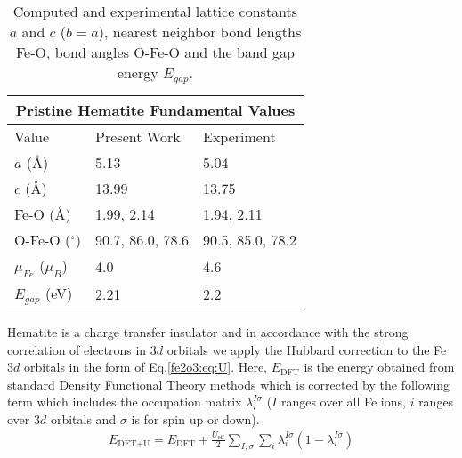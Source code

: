 \begin{table}[H]
\begin{center}
\begin{tabular}{p{2.75cm}p{2.75cm}p{2.75cm}}
 \hline
 \multicolumn{3}{c}{ Pristine Hematite Fundamental Values \vspace{0.5mm}} \\
 \hline
 Value & Present Work & Experiment \cite{finger1980crystal} \\
 \hline
 $a$ ({\AA}) & 5.13  & 5.04 \\
 $c$ ({\AA}) & 13.99  & 13.75 \\
 Fe-O ({\AA}) & 1.99, 2.14  & 1.94, 2.11 \\
 O-Fe-O ($^{\circ}$) &  90.7, 86.0, 78.6 & 90.5, 85.0, 78.2 \\
 $\mu_{Fe}$ ($\mu_B$) & 4.0 & 4.6 \cite{coey1971study} \\
 $E_{gap}$ (eV) &  2.21  & 2.2  \cite{gilbert2009band}\\
 \hline
\end{tabular}
\caption{Computed and experimental lattice constants $a$ and $c$ ($b=a$), nearest neighbor bond lengths Fe-O, bond angles O-Fe-O and the band gap energy $E_{gap}$.} \label{fe2o3:table:pristine}
\end{center}
\end{table}

Hematite is a charge transfer insulator \cite{drager1992high,catti1995theoretical} and in accordance with the strong correlation of electrons in $3d$ orbitals we apply the Hubbard correction \cite{dudarev1998electron} to the Fe $3d$ orbitals in the form of Eq.\ref{fe2o3:eq:U}. Here, $E_\text{DFT}$ is the energy obtained from standard Density Functional Theory methods which is corrected by the following term which includes the occupation matrix $\lambda_i^{I\sigma}$ ($I$ ranges over all Fe ions, $i$ ranges over $3d$ orbitals and $\sigma$ is for spin up or down).
 \begin{align}
    E_{\text{DFT}+\text{U}}=E_{\text{DFT}}+\frac{U_{\text{eff}}}{2}\sum_{I,\sigma}\sum_{i}\lambda_{i}^{I\sigma}(1-\lambda_{i}^{I\sigma}) \label{fe2o3:eq:U}
\end{align}


